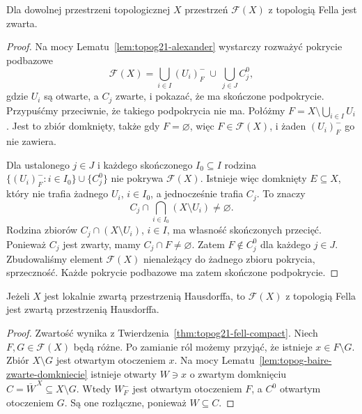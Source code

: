 \begin{twierdzenie}
\label{thm:topog21-fell-compact}
Dla dowolnej przestrzeni topologicznej \(X\)
przestrzeń \(\mathcal F(X)\) z topologią Fella
jest zwarta.
\end{twierdzenie}
\begin{proof}
Na mocy Lematu~\ref{lem:topog21-alexander}
wystarczy rozważyć pokrycie podbazowe
\[
 \mathcal F(X)=
  \bigcup_{i\in I}(U_i)^-_{\!F}\ \cup\
  \bigcup_{j\in J}C_j^0,
\]
gdzie \(U_i\) są otwarte, a \(C_j\) zwarte,
i pokazać, że ma skończone podpokrycie.
Przypuśćmy przeciwnie, że takiego podpokrycia
nie ma. Połóżmy
\(F=X\setminus\bigcup_{i\in I}U_i\).
Jest to zbiór domknięty, także gdy \(F=\varnothing\),
więc \(F\in\mathcal F(X)\), i żaden
\((U_i)^-_{\!F}\) go nie zawiera.

Dla ustalonego \(j\in J\) i każdego skończonego
\(I_0\subseteq I\) rodzina
\(\{(U_i)^-_{\!F}:i\in I_0\}\cup\{C_j^0\}\)
nie pokrywa \(\mathcal F(X)\).
Istnieje więc domknięty \(E\subseteq X\),
który nie trafia żadnego \(U_i\), \(i\in I_0\),
a jednocześnie trafia \(C_j\).
To znaczy
\[
 C_j\cap\bigcap_{i\in I_0}(X\setminus U_i)
 \neq\varnothing.
\]
Rodzina zbiorów \(C_j\cap(X\setminus U_i)\),
\(i\in I\), ma własność skończonych przecięć.
Ponieważ \(C_j\) jest zwarty, mamy
\(C_j\cap F\neq\varnothing\).
Zatem \(F\notin C_j^0\) dla każdego \(j\in J\).
Zbudowaliśmy element \(\mathcal F(X)\)
nienależący do żadnego zbioru pokrycia,
sprzeczność. Każde pokrycie podbazowe
ma zatem skończone podpokrycie.
\end{proof}

\begin{twierdzenie}
\label{thm:topog21-fell-hausdorff}
Jeżeli \(X\) jest lokalnie zwartą przestrzenią
Hausdorffa, to \(\mathcal F(X)\) z topologią Fella
jest zwartą przestrzenią Hausdorffa.
\end{twierdzenie}
\begin{proof}
Zwartość wynika z
Twierdzenia~\ref{thm:topog21-fell-compact}.
Niech \(F,G\in\mathcal F(X)\) będą różne.
Po zamianie ról możemy przyjąć, że
istnieje \(x\in F\setminus G\).
Zbiór \(X\setminus G\) jest otwartym
otoczeniem \(x\). Na mocy
Lematu~\ref{lem:topog-baire-zwarte-domkniecie}
istnieje otwarty \(W\ni x\) o zwartym
domknięciu \(C=\overline W^{\,X}\subseteq X\setminus G\).
Wtedy \(W^-_{\!F}\) jest otwartym otoczeniem \(F\),
a \(C^0\) otwartym otoczeniem \(G\).
Są one rozłączne, ponieważ \(W\subseteq C\).
\end{proof}

